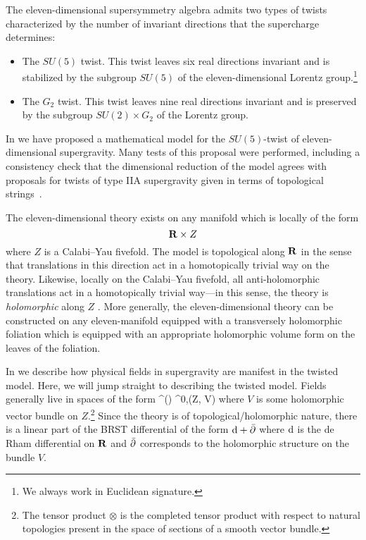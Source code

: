 \documentclass[../main.tex]{subfiles}
\begin{document}
The eleven-dimensional supersymmetry algebra admits two types of twists characterized by the number of invariant directions that the supercharge determines:
\begin{itemize}
\item 
The $SU(5)$ twist. 
This twist leaves six real directions invariant and is stabilized by the subgroup $SU(5)$ of the eleven-dimensional Lorentz group.\footnote{We always work in Euclidean signature.}
\item 
The $G_2$ twist.
This twist leaves nine real directions invariant and is preserved by the subgroup $SU(2) \times G_2$ of the Lorentz group. 
\end{itemize}

In \cite{RSW} we have proposed a mathematical model for the $SU(5)$-twist of eleven-dimensional supergravity.
Many tests of this proposal were performed, including a consistency check that the dimensional reduction of the model agrees with proposals for twists of type IIA supergravity given in terms of topological strings~\cite{CLsugra}.

The eleven-dimensional theory exists on any manifold which is locally of the form 
\[
\mathbf{R} \times Z
\] 
where $Z$ is a Calabi--Yau fivefold.
The model is topological along $\mathbf{R}$ in the sense that translations in this direction act in a homotopically trivial way on the theory.
Likewise, locally on the Calabi--Yau fivefold, all anti-holomorphic translations act in a homotopically trivial way---in this sense, the theory is {\em holomorphic} along $Z$ \cite{BWhol}.
More generally, the eleven-dimensional theory can be constructed on any eleven-manifold equipped with a transversely holomorphic foliation which is equipped with an appropriate holomorphic volume form on the leaves of the foliation.

In \cite{RSW,RWindex} we describe how physical fields in supergravity are manifest in the twisted model.
Here, we will jump straight to describing the twisted model.
Fields generally live in spaces of the form
\beqn
\Omega^\bu(\R) \otimes \Omega^{0,\bu}(Z, V)
\eeqn
where $V$ is some holomorphic vector bundle on $Z$.\footnote{The tensor product $\otimes$ is the completed tensor product with respect to natural topologies present in the space of sections of a smooth vector bundle.}
Since the theory is of topological/holomorphic nature, there is a linear part of the BRST differential of the form $\mathrm{d} + \bar{\partial}$ where $\mathrm{d}$ is the de Rham differential on $\mathbf{R}$ and $\bar{\partial}$ corresponds to the holomorphic structure on the bundle $V$.
\end{document}

